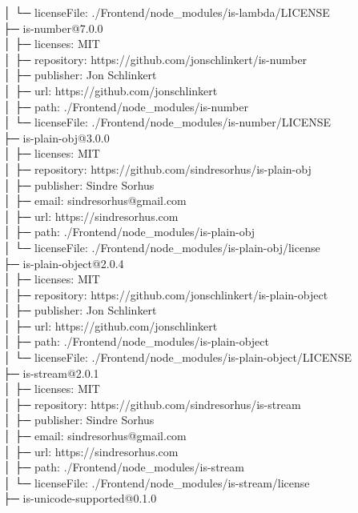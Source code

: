 │  └─ licenseFile: ./Frontend/node\_modules/is-lambda/LICENSE\\
├─ is-number@7.0.0\\
│  ├─ licenses: MIT\\
│  ├─ repository: https://github.com/jonschlinkert/is-number\\
│  ├─ publisher: Jon Schlinkert\\
│  ├─ url: https://github.com/jonschlinkert\\
│  ├─ path: ./Frontend/node\_modules/is-number\\
│  └─ licenseFile: ./Frontend/node\_modules/is-number/LICENSE\\
├─ is-plain-obj@3.0.0\\
│  ├─ licenses: MIT\\
│  ├─ repository: https://github.com/sindresorhus/is-plain-obj\\
│  ├─ publisher: Sindre Sorhus\\
│  ├─ email: sindresorhus@gmail.com\\
│  ├─ url: https://sindresorhus.com\\
│  ├─ path: ./Frontend/node\_modules/is-plain-obj\\
│  └─ licenseFile: ./Frontend/node\_modules/is-plain-obj/license\\
├─ is-plain-object@2.0.4\\
│  ├─ licenses: MIT\\
│  ├─ repository: https://github.com/jonschlinkert/is-plain-object\\
│  ├─ publisher: Jon Schlinkert\\
│  ├─ url: https://github.com/jonschlinkert\\
│  ├─ path: ./Frontend/node\_modules/is-plain-object\\
│  └─ licenseFile: ./Frontend/node\_modules/is-plain-object/LICENSE\\
├─ is-stream@2.0.1\\
│  ├─ licenses: MIT\\
│  ├─ repository: https://github.com/sindresorhus/is-stream\\
│  ├─ publisher: Sindre Sorhus\\
│  ├─ email: sindresorhus@gmail.com\\
│  ├─ url: https://sindresorhus.com\\
│  ├─ path: ./Frontend/node\_modules/is-stream\\
│  └─ licenseFile: ./Frontend/node\_modules/is-stream/license\\
├─ is-unicode-supported@0.1.0\\
